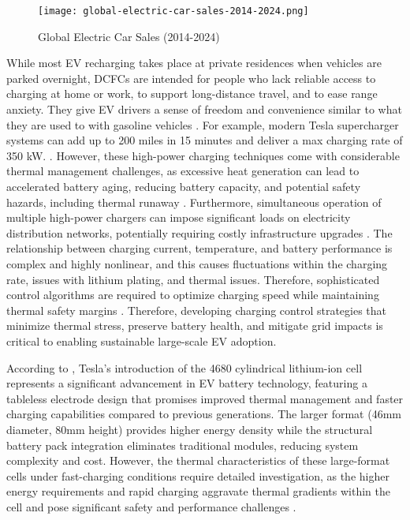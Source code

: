\documentclass[conference]{IEEEtran}
\begin{document}
 \begin{figure}[H]
    \centering
    \texttt{[image: global-electric-car-sales-2014-2024.png]}
    \caption{Global Electric Car Sales (2014-2024)}
    \label{fig:enter-label}
\end{figure}

While most EV recharging takes place at private residences when vehicles are parked overnight, DCFCs are intended for people who lack reliable access to charging at home or work, to support long-distance travel, and to ease range anxiety. They give EV drivers a sense of freedom and convenience similar to what they are used to with gasoline vehicles \cite{MURATORI2019109235}. For example, modern Tesla supercharger systems can add up to 200 miles in 15 minutes and deliver a max charging rate of 350 kW. \cite{tesla2025charging}. However, these high-power charging techniques come with considerable thermal management challenges, as excessive heat generation can lead to accelerated battery aging, reducing battery capacity, and potential safety hazards, including thermal runaway \cite{batteries10100372}.  Furthermore, simultaneous operation of multiple high-power chargers can impose significant loads on electricity distribution networks, potentially requiring costly infrastructure upgrades \cite{DOE2024EVGridImpact}. The relationship between charging current, temperature, and battery performance is complex and highly nonlinear, and this causes fluctuations within the charging rate, issues with lithium plating, and thermal issues. Therefore, sophisticated control algorithms are required to optimize charging speed while maintaining thermal safety margins \cite{app14114728}. Therefore, developing charging control strategies that minimize thermal stress, preserve battery health, and mitigate grid impacts is critical to enabling sustainable large-scale EV adoption.

According to \cite{klender2020tesla}, Tesla's introduction of the 4680 cylindrical lithium-ion cell represents a significant advancement in EV battery technology, featuring a tableless electrode design that promises improved thermal management and faster charging capabilities compared to previous generations. The larger format (46mm diameter, 80mm height) provides higher energy density while the structural battery pack integration eliminates traditional modules, reducing system complexity and cost. However, the thermal characteristics of these large-format cells under fast-charging conditions require detailed investigation, as the higher energy requirements and rapid charging aggravate thermal gradients within the cell and pose significant safety and performance challenges \cite{LEI2024132629}.
\end{document}
